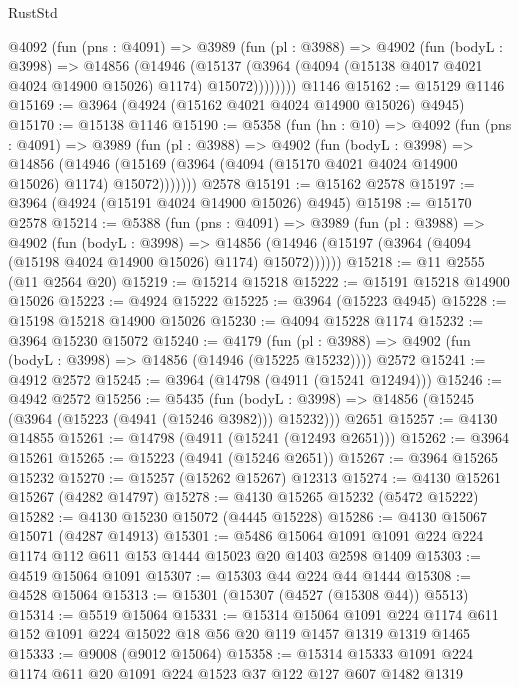 \begin{lexlean}{RustStd}
\begin{coremodule}
      @4092
        (fun (pns : @4091) =>
        @3989
          (fun (pl : @3988) =>
          @4902
            (fun (bodyL : @3998) =>
            @14856
              (@14946
                (@15137 (@3964 (@4094 (@15138 @4017 @4021 @4024 @14900 @15026) @1174) @15072))))))))
    @1146
@15162 := @15129 @1146
@15169 := @3964 (@4924 (@15162 @4021 @4024 @14900 @15026) @4945)
@15170 := @15138 @1146
@15190 := @5358
    (fun (hn : @10) =>
    @4092
      (fun (pns : @4091) =>
      @3989
        (fun (pl : @3988) =>
        @4902
          (fun (bodyL : @3998) =>
          @14856
            (@14946 (@15169 (@3964 (@4094 (@15170 @4021 @4024 @14900 @15026) @1174) @15072)))))))
    @2578
@15191 := @15162 @2578
@15197 := @3964 (@4924 (@15191 @4024 @14900 @15026) @4945)
@15198 := @15170 @2578
@15214 := @5388
    (fun (pns : @4091) =>
    @3989
      (fun (pl : @3988) =>
      @4902
        (fun (bodyL : @3998) =>
        @14856 (@14946 (@15197 (@3964 (@4094 (@15198 @4024 @14900 @15026) @1174) @15072))))))
@15218 := @11 @2555 (@11 @2564 @20)
@15219 := @15214 @15218
@15222 := @15191 @15218 @14900 @15026
@15223 := @4924 @15222
@15225 := @3964 (@15223 @4945)
@15228 := @15198 @15218 @14900 @15026
@15230 := @4094 @15228 @1174
@15232 := @3964 @15230 @15072
@15240 := @4179
    (fun (pl : @3988) => @4902 (fun (bodyL : @3998) => @14856 (@14946 (@15225 @15232))))
    @2572
@15241 := @4912 @2572
@15245 := @3964 (@14798 (@4911 (@15241 @12494)))
@15246 := @4942 @2572
@15256 := @5435
    (fun (bodyL : @3998) => @14856 (@15245 (@3964 (@15223 (@4941 (@15246 @3982))) @15232)))
    @2651
@15257 := @4130 @14855
@15261 := @14798 (@4911 (@15241 (@12493 @2651)))
@15262 := @3964 @15261
@15265 := @15223 (@4941 (@15246 @2651))
@15267 := @3964 @15265 @15232
@15270 := @15257 (@15262 @15267) @12313
@15274 := @4130 @15261 @15267 (@4282 @14797)
@15278 := @4130 @15265 @15232 (@5472 @15222)
@15282 := @4130 @15230 @15072 (@4445 @15228)
@15286 := @4130 @15067 @15071 (@4287 @14913)
@15301 := @5486 @15064 @1091 @1091 @224 @224 @1174 @112 @611 @153 @1444 @15023 @20 @1403 @2598 @1409
@15303 := @4519 @15064 @1091
@15307 := @15303 @44 @224 @44 @1444
@15308 := @4528 @15064
@15313 := @15301 (@15307 (@4527 (@15308 @44)) @5513)
@15314 := @5519 @15064
@15331 := @15314
    @15064
    @1091
    @224
    @1174
    @611
    @152
    @1091
    @224
    @15022
    @18
    @56
    @20
    @119
    @1457
    @1319
    @1319
    @1465
@15333 := @9008 (@9012 @15064)
@15358 := @15314
    @15333
    @1091
    @224
    @1174
    @611
    @20
    @1091
    @224
    @1523
    @37
    @122
    @127
    @607
    @1482
    @1319

\end{coremodule}
\end{lexlean}
